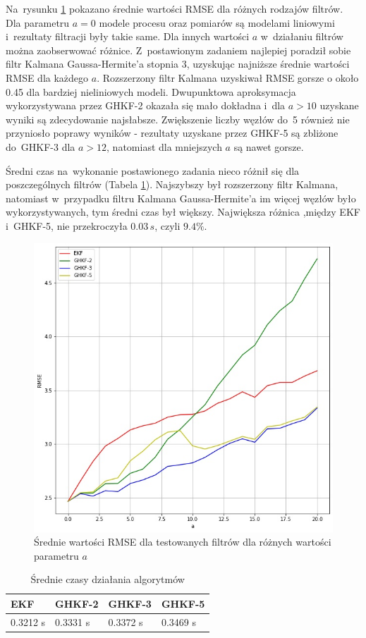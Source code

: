 Na~rysunku \ref{fig:rmse_test_results} pokazano średnie wartości RMSE dla różnych rodzajów filtrów. Dla parametru $a=0$ modele procesu oraz pomiarów są modelami liniowymi i~rezultaty filtracji były takie same. Dla innych wartości $a$ w~działaniu filtrów można zaobserwować różnice. Z~postawionym zadaniem najlepiej poradził sobie filtr Kalmana Gaussa-Hermite'a stopnia 3, uzyskując najniższe średnie wartości RMSE dla każdego $a$. Rozszerzony filtr Kalmana uzyskiwał RMSE gorsze o około 0.45 dla bardziej nieliniowych modeli. Dwupunktowa aproksymacja wykorzystywana przez GHKF-2 okazała się mało dokładna i~dla $a>10$ uzyskane wyniki są zdecydowanie najsłabsze. Zwiększenie liczby węzłów do~5 również nie przyniosło poprawy wyników - rezultaty uzyskane przez GHKF-5 są zbliżone do~GHKF-3 dla $a>12$, natomiast dla mniejszych $a$ są nawet gorsze. \par
Średni czas na~wykonanie postawionego zadania nieco różnił się dla poszczególnych filtrów (Tabela \ref{tab:rmse_times}). Najszybszy był rozszerzony filtr Kalmana, natomiast w~przypadku filtru Kalmana Gaussa-Hermite'a im więcej węzłów było wykorzystywanych, tym średni czas był większy. Największa różnica ,między EKF i~GHKF-5, nie przekroczyła $0.03\,s$, czyli $9.4\%$.
\begin{figure}[h!]
	\centering
	\includegraphics[width=0.5\linewidth]{rmse_test_results.jpg}
	\caption{Średnie wartości RMSE dla testowanych filtrów dla różnych wartości parametru $a$}
	\label{fig:rmse_test_results}
\end{figure}
\begin{table}[]
	\caption{Średnie czasy działania algorytmów}
	\label{tab:rmse_times}
	\begin{center}
		\begin{tabular}{|l|l|l|l|}
			\hline
			\textbf{EKF} & \textbf{GHKF-2} & \textbf{GHKF-3} & \textbf{GHKF-5} \\ 
			\hline
			0.3212 s & 0.3331 s & 0.3372 s & 0.3469 s \\
			\hline
		\end{tabular}
	\end{center}
\end{table}


